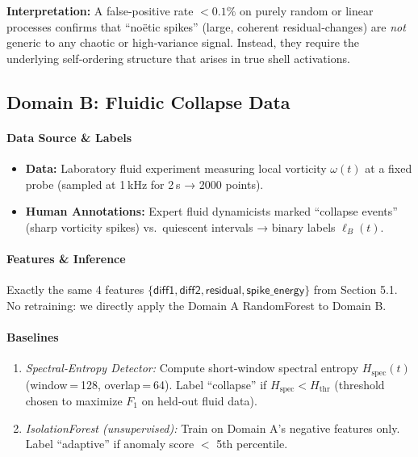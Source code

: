 \documentclass[11pt]{article}
\begin{document}
\vspace{-0.5em}
\noindent\textbf{Interpretation:}  
A false‐positive rate \(<0.1\%\) on purely random or linear processes confirms that “noëtic spikes” (large, coherent residual‐changes) are \emph{not} generic to any chaotic or high‐variance signal. Instead, they require the underlying self‐ordering structure that arises in true shell activations.

\subsection{Domain B: Fluidic Collapse Data}
\paragraph{Data Source \& Labels}
\begin{itemize}[itemsep=1pt]
  \item \textbf{Data:} Laboratory fluid experiment measuring local vorticity \(\omega(t)\) at a fixed probe (sampled at 1 kHz for 2 s → 2000 points).
  \item \textbf{Human Annotations:} Expert fluid dynamicists marked “collapse events” (sharp vorticity spikes) vs.\ quiescent intervals → binary labels \(\ell_B(t)\).
\end{itemize}

\paragraph{Features \& Inference}
Exactly the same 4 features \(\{\mathsf{diff1}, \mathsf{diff2}, \mathsf{residual}, \mathsf{spike\_energy}\}\) from Section 5.1. No retraining: we directly apply the Domain A RandomForest to Domain B.

\paragraph{Baselines}
\begin{enumerate}[label=(\roman*),itemsep=1pt]
  \item \emph{Spectral‐Entropy Detector:}  
    Compute short‐window spectral entropy \(H_{\mathrm{spec}}(t)\) (window = 128, overlap = 64).  
    Label “collapse” if \(H_{\mathrm{spec}} < H_{\mathrm{thr}}\) (threshold chosen to maximize \(F_{1}\) on held‐out fluid data).  
  \item \emph{IsolationForest (unsupervised):}  
    Train on Domain A’s negative features only. Label “adaptive” if anomaly score \(<\) 5th percentile.  
\end{enumerate}
\end{document}
